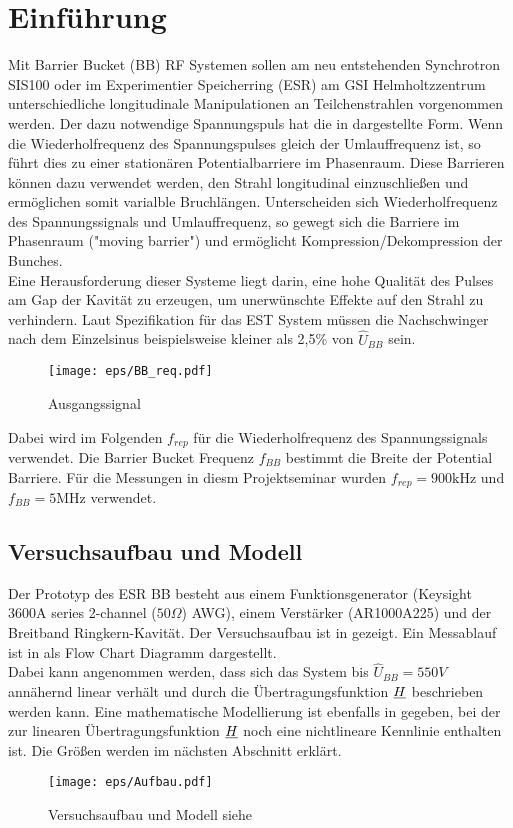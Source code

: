 \documentclass[../Report.tex]{subfiles}
\begin{document}
\chapter{Einführung}
\label{chap:einfuehrung}
Mit Barrier Bucket (BB) RF Systemen sollen am neu entstehenden Synchrotron SIS100 oder im Experimentier Speicherring (ESR) am GSI Helmholtzzentrum unterschiedliche longitudinale Manipulationen an Teilchenstrahlen vorgenommen werden. Der dazu notwendige Spannungspuls hat die in  dargestellte Form. Wenn die Wiederholfrequenz des Spannungspulses gleich der Umlauffrequenz ist, so führt dies zu einer stationären Potentialbarriere im Phasenraum. Diese Barrieren können dazu verwendet werden, den Strahl longitudinal einzuschließen und ermöglichen somit varialble Bruchlängen. Unterscheiden sich Wiederholfrequenz des Spannungssignals und Umlauffrequenz, so gewegt sich die Barriere im Phasenraum ("moving barrier") und ermöglicht Kompression/Dekompression der Bunches.\\ Eine Herausforderung dieser Systeme liegt darin, eine hohe Qualität des Pulses am Gap der Kavität zu erzeugen, um unerwünschte Effekte auf den Strahl zu verhindern. Laut Spezifikation für das EST System müssen die Nachschwinger nach dem Einzelsinus beispielsweise kleiner als 2,5\% von $\hat{U}_{BB}$ sein.
\begin{figure}[H]
  \centering
  \texttt{[image: eps/BB\_req.pdf]}
  \caption{Ausgangssignal}
  \label{fig:BB_req}
\end{figure}

Dabei wird im Folgenden $f_{rep}$ für die Wiederholfrequenz des Spannungssignals verwendet. Die Barrier Bucket Frequenz $f_{BB}$ bestimmt die Breite der Potential Barriere. Für die Messungen in diesm Projektseminar wurden ${f_{rep} = 900 \si{\kilo \hertz}}$ und ${f_{BB} = 5 \si{\mega \hertz}}$ verwendet.


\section[Modell und Konvention]{Versuchsaufbau und Modell}
\label{sec:einf.modell_BB}
Der Prototyp des ESR BB besteht aus einem Funktionsgenerator (Keysight 3600A series 2-channel ($50\Omega $) AWG), einem Verstärker (AR1000A225) und der Breitband Ringkern-Kavität. Der Versuchsaufbau ist in  gezeigt. Ein Messablauf ist in  als Flow Chart Diagramm dargestellt.\\
Dabei kann angenommen werden, dass sich das System bis $\hat{U}_{BB} = 550V$ annähernd linear verhält und durch die Übertragungsfunktion $\underline{H}$ beschrieben werden kann. Eine mathematische Modellierung ist ebenfalls in  gegeben, bei der zur linearen Übertragungsfunktion $\underline{H}$ noch eine nichtlineare Kennlinie enthalten ist. Die Größen werden im nächsten Abschnitt erklärt.
\begin{figure}[H]
	\centering
	\texttt{[image: eps/Aufbau.pdf]}
	\caption{Versuchsaufbau und Modell siehe \cite{harzheim}}
  	\label{fig:Aufbau}
\end{figure}
\end{document}
